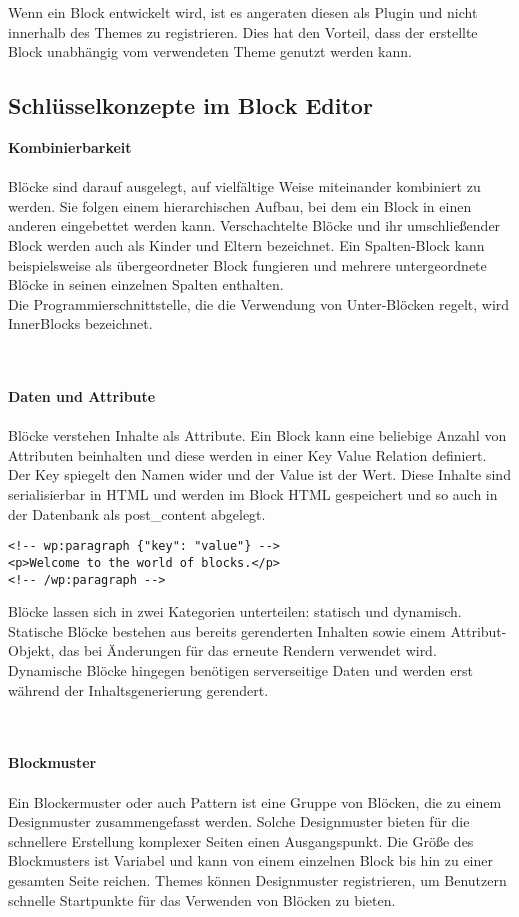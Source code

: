 Wenn ein Block entwickelt wird, ist es angeraten diesen als \gls{Plugin} und nicht innerhalb des Themes zu registrieren.
Dies hat den Vorteil, dass der erstellte Block unabhängig vom verwendeten Theme genutzt werden kann.
\newpage
\subsection{Schlüsselkonzepte im Block Editor}
\textbf{Kombinierbarkeit}
\\\\
Blöcke sind darauf ausgelegt, auf vielfältige Weise miteinander kombiniert zu werden.
Sie folgen einem hierarchischen Aufbau, bei dem ein Block in einen anderen eingebettet werden kann.
Verschachtelte Blöcke und ihr umschließender Block werden auch als Kinder und Eltern bezeichnet.
Ein Spalten-Block kann beispielsweise als übergeordneter Block fungieren und mehrere untergeordnete Blöcke in seinen einzelnen Spalten enthalten.
\\
Die Programmierschnittstelle, die die Verwendung von Unter-Blöcken regelt, wird InnerBlocks bezeichnet.


\\\\
\textbf{Daten und Attribute}
\\\\
Blöcke verstehen Inhalte als Attribute.
Ein Block kann eine beliebige Anzahl von Attributen beinhalten und diese werden in einer Key Value Relation definiert.
Der Key spiegelt den Namen wider und der Value ist der Wert.
Diese Inhalte sind serialisierbar in HTML und werden im Block HTML gespeichert und so auch in der Datenbank als post\_content abgelegt.


\begin{lstlisting}[caption={Beispiel eines Gutenberg-Blocks in WordPress}]
<!-- wp:paragraph {"key": "value"} -->
<p>Welcome to the world of blocks.</p>
<!-- /wp:paragraph -->
\end{lstlisting}

Blöcke lassen sich in zwei Kategorien unterteilen: statisch und dynamisch.
Statische Blöcke bestehen aus bereits gerenderten Inhalten sowie einem Attribut-Objekt, das bei Änderungen für das erneute Rendern verwendet wird.
Dynamische Blöcke hingegen benötigen serverseitige Daten und werden erst während der Inhaltsgenerierung gerendert.




\\\\
\textbf{Blockmuster}
\\\\
Ein Blockermuster oder auch Pattern ist eine Gruppe von Blöcken, die zu einem Designmuster zusammengefasst werden.
Solche Designmuster bieten für die schnellere Erstellung komplexer Seiten einen Ausgangspunkt.
Die Größe des Blockmusters ist Variabel und kann von einem einzelnen Block bis hin zu einer gesamten Seite reichen.
Themes können Designmuster registrieren, um Benutzern schnelle Startpunkte für das Verwenden von Blöcken zu bieten.

